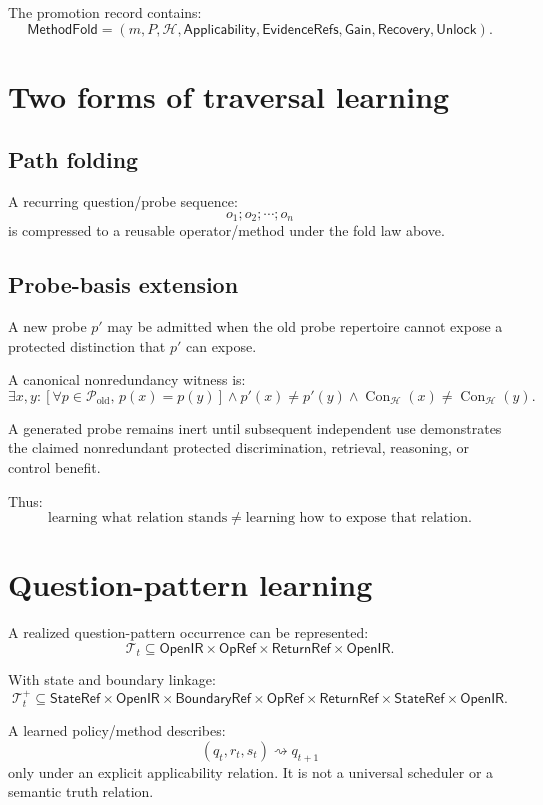 \documentclass[11pt,oneside]{article}
\newcommand{\OpenIR}{\mathsf{OpenIR}}
\newcommand{\StateRef}{\mathsf{StateRef}}
\newcommand{\ReturnRef}{\mathsf{ReturnRef}}
\newcommand{\OpRef}{\mathsf{OpRef}}
\newcommand{\BoundaryRef}{\mathsf{BoundaryRef}}
\newcommand{\Con}{\operatorname{Con}}
\begin{document}
The promotion record contains:
\[
\boxed{
\mathsf{MethodFold}
=
(
m,P,\mathcal H,\mathsf{Applicability},
\mathsf{EvidenceRefs},\mathsf{Gain},
\mathsf{Recovery},\mathsf{Unlock}
).
}
\]

\section{Two forms of traversal learning}

\subsection{Path folding}

A recurring question/probe sequence:
\[
o_1;o_2;\cdots;o_n
\]
is compressed to a reusable operator/method under the fold law above.

\subsection{Probe-basis extension}

A new probe \(p'\) may be admitted when the old probe repertoire cannot expose a protected distinction that \(p'\) can expose.

A canonical nonredundancy witness is:
\[
\boxed{
\exists x,y:
\left[
\forall p\in\mathcal P_{\mathrm{old}},\,
p(x)=p(y)
\right]
\land
p'(x)\neq p'(y)
\land
\Con_{\mathcal H}(x)\neq\Con_{\mathcal H}(y).
}
\]

A generated probe remains inert until subsequent independent use demonstrates the claimed nonredundant protected discrimination, retrieval, reasoning, or control benefit.

Thus:
\[
\boxed{
\text{learning what relation stands}
\neq
\text{learning how to expose that relation}.
}
\]

\section{Question-pattern learning}

A realized question-pattern occurrence can be represented:
\[
\boxed{
\mathcal T_t
\subseteq
\OpenIR
\times
\OpRef
\times
\ReturnRef
\times
\OpenIR.
}
\]

With state and boundary linkage:
\[
\mathcal T_t^+
\subseteq
\StateRef
\times
\OpenIR
\times
\BoundaryRef
\times
\OpRef
\times
\ReturnRef
\times
\StateRef
\times
\OpenIR.
\]

A learned policy/method describes:
\[
(q_t,r_t,s_t)\rightsquigarrow q_{t+1}
\]
only under an explicit applicability relation.  It is not a universal scheduler or a semantic truth relation.
\end{document}
